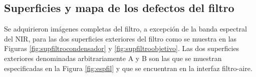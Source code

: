 \singlespacing
\subsection{Superficies y mapa de los defectos del filtro}

\hspace{0.5cm}Se adquirieron imágenes completas del filtro, a excepción de la banda espectral del NIR, para las dos superficies exteriores del filtro como se muestra en las Figuras \ref{fig:supfiltrocondensador} y \ref{fig:supfiltroobjetivo}. Las dos superficies exteriores denominadas arbitrariamente A y B son las que se muestran especificadas en la Figura \ref{fig:espfil} y que se encuentran en la interfaz filtro-aire.

\begin{figure}[H]
	\begin{floatrow}

\end{floatrow}
\end{figure}
